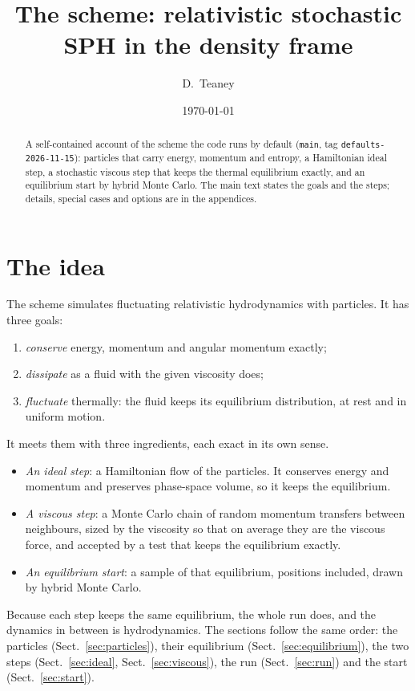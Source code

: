 \documentclass[11pt,aps,preprint,nofootinbib,superscriptaddress,tightenlines]{revtex4-2}
\def\Sect#1{Sect.~\ref{#1}}
\begin{document}
\title{The scheme: relativistic stochastic SPH in the density frame}
\author{D.~Teaney}
\date{\today}

\begin{abstract}
A self-contained account of the scheme the code runs by default (\texttt{main}, tag \texttt{defaults-2026-11-15}): particles that carry
energy, momentum and entropy, a Hamiltonian ideal step, a stochastic viscous step that keeps the thermal equilibrium exactly, and an
equilibrium start by hybrid Monte Carlo.  The main text states the goals and the steps; details, special cases and options are in the appendices.
\end{abstract}

\maketitle

\section{The idea}
\label{sec:idea}

The scheme simulates fluctuating relativistic hydrodynamics with particles.  It has three goals:
\begin{enumerate}
\item \emph{conserve} energy, momentum and angular momentum exactly;
\item \emph{dissipate} as a fluid with the given viscosity does;
\item \emph{fluctuate} thermally: the fluid keeps its equilibrium distribution, at rest and in uniform motion.
\end{enumerate}
It meets them with three ingredients, each exact in its own sense.
\begin{itemize}
\item \emph{An ideal step}: a Hamiltonian flow of the particles.  It conserves energy and momentum and preserves phase-space volume, so it keeps
  the equilibrium.
\item \emph{A viscous step}: a Monte Carlo chain of random momentum transfers between neighbours, sized by the viscosity so that on average they
  are the viscous force, and accepted by a test that keeps the equilibrium exactly.
\item \emph{An equilibrium start}: a sample of that equilibrium, positions included, drawn by hybrid Monte Carlo.
\end{itemize}
Because each step keeps the same equilibrium, the whole run does, and the dynamics in between is hydrodynamics.  The sections follow the
same order: the particles (\Sect{sec:particles}), their equilibrium (\Sect{sec:equilibrium}), the two steps (\Sect{sec:ideal}, \Sect{sec:viscous}),
the run (\Sect{sec:run}) and the start (\Sect{sec:start}).
\end{document}
